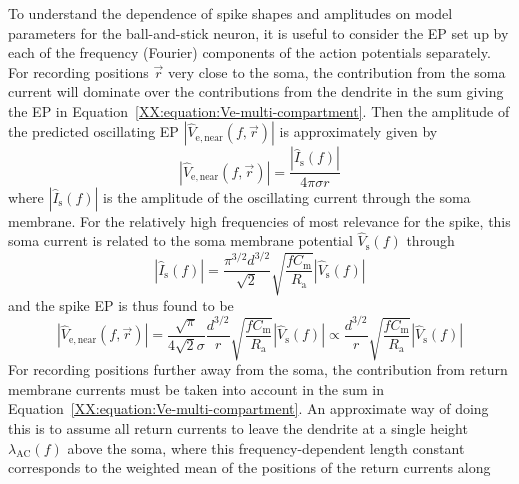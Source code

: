 \subsubsection{}
To understand the dependence of spike shapes and amplitudes on model parameters for the ball-and-stick neuron, it is useful
to consider the EP set up by each of the frequency (Fourier) components of the action potentials separately. 
For recording positions $\vec{r}$ very close to the soma, the contribution from the soma current will dominate over the contributions from the dendrite 
in the sum giving the EP in Equation~\ref{XX:equation:Ve-multi-compartment}. Then the amplitude of the
predicted oscillating EP $|\hat{V}_\mathrm{e,near}(f,\vec{r})|$ is approximately given by 
%
\begin{equation}
  |\hat{V}_\mathrm{e,near}(f,\vec{r})| = \frac{|\hat{I}_\mathrm{s}(f)|}{4 \pi \sigma r} 
  \label{Spikes:box:equation:Ve_near_1}
\end{equation}
%
where $|\hat{I}_\mathrm{s}(f)|$ is the amplitude of the oscillating current through the soma membrane.
For the relatively high frequencies of most relevance for the spike, this soma current is related to the soma membrane potential 
$\hat{V}_\mathrm{s}(f)$ through~\citep{Pettersen2008}
%
\begin{equation}
  |\hat{I}_\mathrm{s}(f)| =  \frac{\pi^{3/2} d^{3/2}}{\sqrt{2}} \sqrt{ \frac{f C_\mathrm{m}}{R_\mathrm{a}} }  |\hat{V}_\mathrm{s}(f)|
  \label{Spikes:box:equation:Isoma}
\end{equation}
%
and the spike EP is thus found to be
%
\begin{equation}
  |\hat{V}_\mathrm{e,near}(f,\vec{r})| 
  = \frac{\sqrt{\pi}}{4 \sqrt{2} \sigma}
     \frac{d^{3/2}}{r} 
     \sqrt{ \frac{f C_\mathrm{m}}{R_\mathrm{a}} }  |\hat{V}_\mathrm{s}(f)| 
  \propto \frac{d^{3/2}}{r} \sqrt{ \frac{f C_\mathrm{m}}{R_\mathrm{a}} }  |\hat{V}_\mathrm{s}(f)| 
  \label{Spikes:box:equation:Ve_near_2}
\end{equation}
%
%
For recording positions further away from the soma, the contribution from return membrane currents must be taken into
account in the sum in Equation~\ref{XX:equation:Ve-multi-compartment}. An approximate way of doing this is to
assume all return currents to leave the dendrite at a single height $\lambda_\mathrm{AC}(f)$ above the soma, where 
this frequency-dependent length constant corresponds to the weighted mean of the positions of the return currents along
